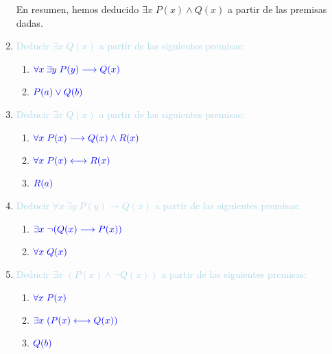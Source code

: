 \documentclass[12pt]{article}
\newcommand{\lb}[1]{\textcolor{lightblue}{#1}}
\newcommand{\db}[1]{\textcolor{blue}{#1}}
\begin{document}
\begin{enumerate}[label=\color{red}\textbf{\arabic*)}, leftmargin=*]
      En resumen, hemos deducido $\exists x\;P(x) \wedge Q(x)$ a partir de las premisas dadas.
      \item \lb{Deducir $\exists x\;Q(x)$ a partir de las siguientes premisas:}
      \begin{enumerate}[label=\color{red}\alph*)]
            \item $\db{\forall x\:\exists y\;P(y)\longrightarrow Q(x)}$
            \item $\db{P(a)\vee Q(b)}$
      \end{enumerate}
      \item \lb{Deducir $\exists x\;Q(x)$ a partir de las siguientes premisas:}
      \begin{enumerate}[label=\color{red}\alph*)]
            \item $\db{\forall x\;P(x)\longrightarrow Q(x)\wedge R(x)}$
            \item $\db{\forall x\; P(x)\longleftrightarrow R(x)}$
            \item $\db{R(a)}$
      \end{enumerate}
      \item \lb{Deducir $\forall x\:\exists y\;P(y)\longrightarrow Q(x)$ a partir de las siguientes premisas:}
      \begin{enumerate}[label=\color{red}\alph*)]
            \item $\db{\exists x\;\neg(Q(x)\longrightarrow P(x))}$
            \item $\db{\forall x\;Q(x)}$
      \end{enumerate}
      \item \lb{Deducir $\exists x\;(P(x)\wedge\neg Q(x))$ a partir de las siguientes premisas:}
      \begin{enumerate}[label=\color{red}\alph*)]
            \item $\db{\forall x\;P(x)}$
            \item $\db{\exists x\;(P(x)\longleftrightarrow Q(x))}$
            \item $\db{Q(b)}$
      \end{enumerate}
\end{enumerate}
\newpage
\end{document}

